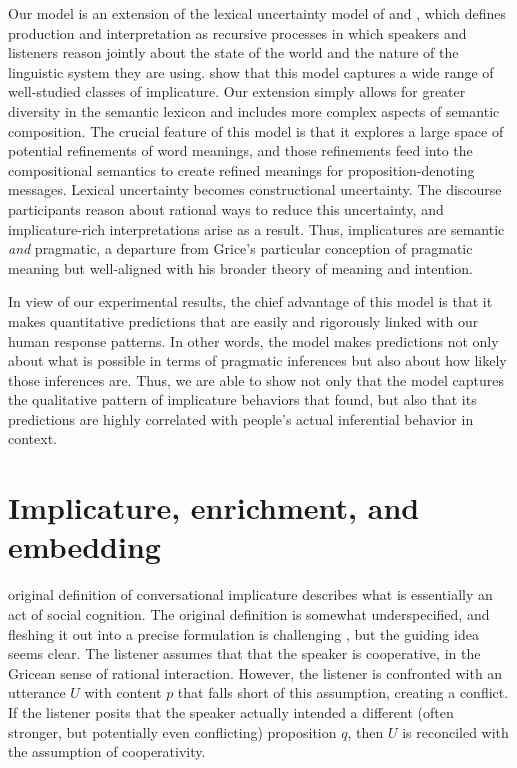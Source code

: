 \documentclass[leqno]{article}
\begin{document}
Our model is an extension of the lexical uncertainty model of
\citet{Bergen:Goodman:Levy:2012} and \citet{Bergen:Levy:Goodman:2014},
which defines production and interpretation as recursive processes in
which speakers and listeners reason jointly about the state of the
world and the nature of the linguistic system they are
using. \citeauthor{Bergen:Levy:Goodman:2014} show that this model
captures a wide range of well-studied classes of implicature.  Our
extension simply allows for greater diversity in the semantic lexicon
and includes more complex aspects of semantic composition.  The
crucial feature of this model is that it explores a large space of
potential refinements of word meanings, and those refinements feed
into the compositional semantics to create refined meanings for
proposition-denoting messages. Lexical uncertainty becomes
constructional uncertainty. The discourse participants reason about
rational ways to reduce this uncertainty, and implicature-rich
interpretations arise as a result. Thus, implicatures are semantic
\emph{and} pragmatic, a departure from Grice's particular conception
of pragmatic meaning but well-aligned with his broader theory of
meaning and intention.

In view of our experimental results, the chief advantage of this model
is that it makes quantitative predictions that are easily and
rigorously linked with our human response patterns. In other words,
the model makes predictions not only about what is possible in terms
of pragmatic inferences but also about how likely those inferences
are. Thus, we are able to show not only that the model captures the
qualitative pattern of implicature behaviors that
\citeauthor{Chemla:Spector:2011} found, but also that its predictions
are highly correlated with people's actual inferential behavior in
context.


\section{Implicature, enrichment, and embedding }\label{sec:implicature}

 original definition of conversational implicature
describes what is essentially an act of social cognition. The original
definition is somewhat underspecified, and fleshing it out into a
precise formulation is challenging \citep{Hirschberg85}, but the
guiding idea seems clear.  The listener assumes that that the speaker
is cooperative, in the Gricean sense of rational interaction. However,
the listener is confronted with an utterance $U$ with content $p$ that
falls short of this assumption, creating a conflict. If the listener
posits that the speaker actually intended a different (often stronger,
but potentially even conflicting) proposition $q$, then $U$ is
reconciled with the assumption of cooperativity.
\end{document}
